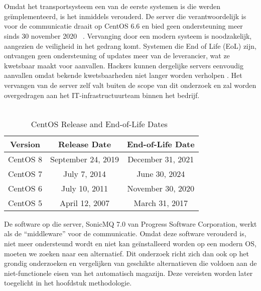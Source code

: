 \section{}%
\label{sec:Het onderwerp}
Omdat het transportsysteem een van de eerste systemen is die werden geïmplementeerd, is het inmiddels verouderd. 
De server die verantwoordelijk is voor de communicatie draait op CentOS 6.6 en bied geen ondersteuning meer sinds 30 november 2020 ~\autocite{Reock2020}.
Vervanging door een modern systeem is noodzakelijk, aangezien de veiligheid in het gedrang komt.
Systemen die End of Life (EoL) zijn, ontvangen geen ondersteuning of updates meer van de leverancier, 
wat ze kwetsbaar maakt voor aanvallen.
Hackers kunnen dergelijke servers eenvoudig aanvallen omdat bekende kwetsbaarheden niet langer worden verholpen \autocite{Mittal2024}.
Het vervangen van de server zelf valt buiten de scope van dit onderzoek en zal worden overgedragen aan het IT-infrastructuurteam binnen het bedrijf.
\\\\
\begin{table}[h!]
  \centering
  \begin{tabular}{|c|c|c|}
      \hline
      \textbf{Version} & \textbf{Release Date} & \textbf{End-of-Life Date} \\
      \hline
      CentOS 8 & September 24, 2019 & December 31, 2021 \\
      \hline
      CentOS 7 & July 7, 2014 & June 30, 2024 \\
      \hline
      CentOS 6 & July 10, 2011 & November 30, 2020 \\
      \hline
      CentOS 5 & April 12, 2007 & March 31, 2017 \\
      \hline
  \end{tabular}
  \caption{CentOS Release and End-of-Life Dates~\autocite{Reock2020}}
  \label{tab:centos6}
\end{table}
\newline
 
De software op die server, SonicMQ 7.0 van Progress Software Corporation, werkt als de ``middleware'' voor de communicatie.
Omdat deze software verouderd is, niet meer ondersteund wordt en niet kan geïnstalleerd worden op een modern OS, moeten we zoeken naar een alternatief.
Dit onderzoek richt zich dan ook op het grondig onderzoeken en vergelijken van geschikte alternatieven die voldoen aan de 
niet-functionele eisen van het automatisch magazijn. Deze vereisten worden later toegelicht in het hoofdstuk methodologie.
\newline

